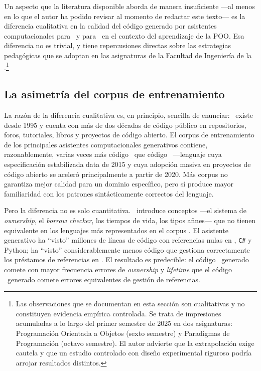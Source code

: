 \noindent
Un aspecto que la literatura disponible aborda de manera insuficiente ---al menos
en lo que el autor ha podido revisar al momento de redactar este texto--- es la
diferencia cualitativa en la calidad del código generado por asistentes
computacionales para \java\ y para \rust\ en el contexto del aprendizaje
de la POO. Esa diferencia no es trivial, y tiene repercusiones directas
sobre las estrategias pedagógicas que se adoptan en las asignaturas de
la Facultad de Ingeniería de la \ud.\footnote{Las observaciones que se
documentan en esta sección son cualitativas y no constituyen evidencia
empírica controlada. Se trata de impresiones acumuladas a lo largo del
primer semestre de 2025 en dos asignaturas: Programación Orientada a Objetos
(sexto semestre) y Paradigmas de Programación (octavo semestre). El autor
advierte que la extrapolación exige cautela y que un estudio controlado
con diseño experimental riguroso podría arrojar resultados distintos.}

\subsection{La asimetría del corpus de entrenamiento}
\label{subsec:asimetria-corpus}

La razón de la diferencia cualitativa es, en principio, sencilla de enunciar:
\java\ existe desde 1995 y cuenta con más de dos décadas de código público
en repositorios, foros, tutoriales, libros y proyectos de código abierto.
El corpus de entrenamiento de los principales asistentes computacionales
generativos contiene, razonablemente, varias veces más código \java\ que
código \rust\ ---lenguaje cuya especificación estabilizada data de 2015 y cuya
adopción masiva en proyectos de código abierto se aceleró principalmente a
partir de 2020. Más corpus no garantiza mejor calidad para un dominio específico,
pero sí produce mayor familiaridad con los patrones sintácticamente correctos del lenguaje.

Pero la diferencia no es solo cuantitativa. \rust\ introduce conceptos ---el
sistema de \textit{ownership}, el \textit{borrow checker}, los tiempos de vida,
los tipos afines--- que no tienen equivalente en los lenguajes más representados
en el corpus \parencite{Klabnik2023}. El asistente generativo ha ``visto'' millones de líneas de código
con referencias nulas en \java, \texttt{C\#} y Python; ha ``visto'' considerablemente
menos código que gestiona correctamente los préstamos de referencias en \rust.
El resultado es predecible: el código \rust\ generado comete con mayor frecuencia
errores de \textit{ownership} y \textit{lifetime} que el código \java\ generado
comete errores equivalentes de gestión de referencias.

